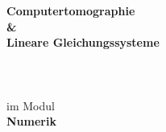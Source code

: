 
\begin{titlepage}
\def\svgwidth{70mm}

	\enlargethispage{20mm}
	\begin{center}
		\vspace*{18mm}	{\huge\textbf {Computertomographie} }\\
		\vspace*{5mm}	{\LARGE\textbf {\&} }\\
		\vspace*{5mm}	{\huge\textbf {Lineare Gleichungssysteme} }\\
		\vspace*{22mm}	{\large\textbf \arbeit}\\
		\vspace*{8mm}	\langartikelstudiengang{} \langstudiengang{} \studiengang\\
    \vspace*{3mm}		\langanderdh{} \dhbw\\
		\vspace*{12mm}	{im Modul}\\
		\vspace*{3mm}	{\large\textbf {Numerik}}\\



\end{center}
\end{titlepage}
